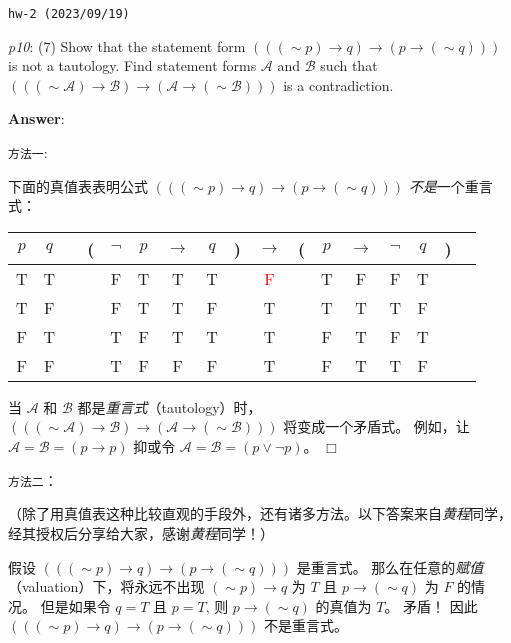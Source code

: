 \documentclass[UTF8,12pt,a4paper]{ctexart}
\newcommand{\negs}{\sim\!}
\begin{document}
\noindent\texttt{hw-2 (2023/09/19)}

\emph{p10}: (7) \quad
Show that the statement form $(((\negs p) \to q)  \to (p \to (\negs q)))$ 
is not a tautology. Find statement forms $\mathscr{A}$ and $\mathscr{B}$ such that 
$(((\negs \mathscr{A}) \to \mathscr{B})  \to (\mathscr{A} \to (\negs \mathscr{B})))$ is a contradiction.

\noindent\textbf{Answer}:

\noindent \texttt{方法一}:

下面的真值表表明公式
 $(((\negs p) \to q)  \to (p \to (\negs q)))$ 
\textit{不是}一个重言式：
\begin{center}
	\hspace{8em} 
	\begin{tabular}{@{ }c@{ }@{ }c | c@{ }@{}c@{}@{ }c@{ }@{ }c@{ }@{ }c@{ }@{ }c@{ }@{}c@{}@{ }c@{ }@{}c@{}@{ }c@{ }@{ }c@{ }@{ }c@{ }@{ }c@{ }@{}c@{}@{ }c}
		$p$ & $q$ &  & ( & $\lnot$ & $p$ & $\rightarrow$ & $q$ & ) & $\rightarrow$ & ( & $p$ & $\rightarrow$ & $\lnot$ & $q$ & ) & \\
		\hline 
		T & T &  &  & F & T & T & T &  & \textcolor{red}{F} &  & T & F & F & T &  & \\
		T & F &  &  & F & T & T & F &  & {T} &  & T & T & T & F &  & \\
		F & T &  &  & T & F & T & T &  & {T} &  & F & T & F & T &  & \\
		F & F &  &  & T & F & F & F &  & {T} &  & F & T & T & F &  & \\
	\end{tabular}
\end{center}

当  $\mathscr{A}$ 和 $\mathscr{B}$ 都是\textit{重言式}（tautology）时，
$(((\negs \mathscr{A}) \to \mathscr{B})  \to (\mathscr{A} \to (\negs \mathscr{B})))$ 
将变成一个矛盾式。
例如，让 $\mathscr{A} = \mathscr{B} = (p \to p)$ 抑或令
$\mathscr{A} = \mathscr{B} = (p \lor  \neg p)$。
\hfill $\Box$


\vspace{1em}
\noindent \texttt{方法二}：

（除了用真值表这种比较直观的手段外，还有诸多方法。以下答案来自\textit{黄程}同学，经其授权后分享给大家，感谢\textit{黄程}同学！）

假设 $(((\negs p) \to q)  \to (p \to (\negs q)))$ 是重言式。
那么在任意的\textit{赋值}（valuation）下，将永远不出现 $(\negs p) \to q $ 为 $T$ 且 $p \to (\negs q)$ 为 $F$ 的情况。 
但是如果令 $q = T$ 且 $p = T$, 
则 $p \to (\negs q)$ 的真值为 $T$。
矛盾！ 
因此 $(((\negs p) \to q)  \to (p \to (\negs q)))$ 不是重言式。
\end{document}
